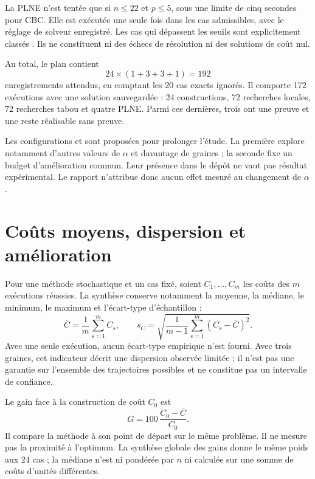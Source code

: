 La PLNE n'est tentée que si $n\leq22$ et $p\leq5$, sous une limite de cinq
secondes pour CBC. Elle est exécutée une seule fois dans les cas admissibles,
avec le réglage de solveur enregistré. Les cas qui dépassent les seuils sont
explicitement classés . Ils ne constituent ni des échecs de
résolution ni des solutions de coût nul.

Au total, le plan contient
\begin{equation}
24\times(1+3+3+1)=192
\end{equation}
enregistrements attendus, en comptant les 20 cas exacts ignorés. Il comporte
172 exécutions avec une solution sauvegardée : 24 constructions, 72 recherches
locales, 72 recherches tabou et quatre PLNE. Parmi ces dernières, trois ont
une preuve et une reste réalisable sans preuve.

Les configurations  et
 sont proposées pour prolonger l'étude.
La première explore notamment d'autres valeurs de $\alpha$ et davantage de
graines ; la seconde fixe un budget d'amélioration commun. Leur présence
dans le dépôt ne vaut pas résultat expérimental. Le rapport n'attribue donc
aucun effet mesuré au changement de $\alpha$.

\section{Coûts moyens, dispersion et amélioration}
Pour une méthode stochastique et un cas fixé, soient $C_1,\ldots,C_m$ les
coûts des $m$ exécutions réussies. La synthèse conserve notamment la moyenne,
la médiane, le minimum, le maximum et l'écart-type d'échantillon :
\begin{equation}
\overline C=\frac1m\sum_{s=1}^m C_s,\qquad
s_C=\sqrt{\frac{1}{m-1}\sum_{s=1}^m(C_s-\overline C)^2}.
\end{equation}
Avec une seule exécution, aucun écart-type empirique n'est fourni. Avec trois
graines, cet indicateur décrit une dispersion observée limitée ; il n'est pas
une garantie sur l'ensemble des trajectoires possibles et ne constitue pas
un intervalle de confiance.

Le gain face à la construction de coût $C_0$ est
\begin{equation}
G=100\,\frac{C_0-\overline C}{C_0}.
\end{equation}
Il compare la méthode à son point de départ sur le même problème. Il ne mesure
pas la proximité à l'optimum. La synthèse globale des gains donne le même poids
aux 24 cas ; la médiane n'est ni pondérée par $n$ ni calculée sur une somme
de coûts d'unités différentes.

